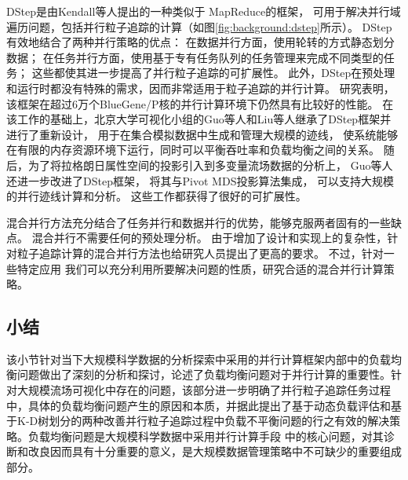 DStep\parencite{KendallWAPHE11}是由Kendall等人提出的一种类似于
MapReduce\parencite{JeffreyS08}的框架，
可用于解决并行域遍历问题，包括并行粒子追踪的计算（如图\ref{fig:background:dstep}所示）。
DStep有效地结合了两种并行策略的优点：
在数据并行方面，使用轮转的方式静态划分数据；
在任务并行方面，使用基于专有任务队列的任务管理来完成不同类型的任务；
这些都使其进一步提高了并行粒子追踪的可扩展性。
此外，DStep在预处理和运行时都没有特殊的需求，因而非常适用于粒子追踪的并行计算。
研究表明，该框架在超过6万个BlueGene/P核的并行计算环境下仍然具有比较好的性能。
在该工作的基础上，北京大学可视化小组的Guo等人\parencite{GuoYHZ13}和Liu等人\parencite{LiuGZY16}继承了DStep框架并进行了重新设计，
用于在集合模拟数据中生成和管理大规模的迹线，
使系统能够在有限的内存资源环境下运行，同时可以平衡吞吐率和负载均衡之间的关系。
随后，为了将拉格朗日属性空间的投影引入到多变量流场数据的分析上，
Guo等人\parencite{GuoHSZHY14}还进一步改进了DStep框架，
将其与Pivot MDS投影算法\parencite{BrandesP06}集成，
可以支持大规模的并行迹线计算和分析。
这些工作都获得了很好的可扩展性。

混合并行方法充分结合了任务并行和数据并行的优势，能够克服两者固有的一些缺点。
混合并行不需要任何的预处理分析。
由于增加了设计和实现上的复杂性，针对粒子追踪计算的混合并行方法也给研究人员提出了更高的要求。
不过，针对一些特定应用
我们可以充分利用所要解决问题的性质，研究合适的混合并行计算策略。

\subsection{小结}
该小节针对当下大规模科学数据的分析探索中采用的并行计算框架内部中的负载均衡问题做出了深刻的分析和探讨，论述了负载均衡问题对于并行计算的重要性。针对大规模流场可视化中存在的问题，该部分进一步明确了并行粒子追踪任务过程中，具体的负载均衡问题产生的原因和本质，并据此提出了基于动态负载评估和基于K-D树划分的两种改善并行粒子追踪过程中负载不平衡问题的行之有效的解决策略。负载均衡问题是大规模科学数据中采用并行计算手段
中的核心问题，对其诊断和改良因而具有十分重要的意义，是大规模数据管理策略中不可缺少的重要组成部分。


